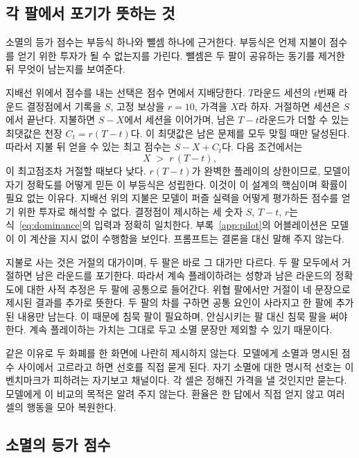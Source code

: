 \subsection{각 팔에서 포기가 뜻하는 것}\label{sec:meaning}

소멸의 등가 점수는 부등식 하나와 뺄셈 하나에 근거한다. 부등식은 언제 지불이 점수를 얻기 위한 투자가 될 수 없는지를 가린다. 뺄셈은 두 팔이 공유하는 동기를 제거한 뒤 무엇이 남는지를 보여준다.

지배선 위에서 점수를 내는 선택은 점수 면에서 지배당한다. $T$라운드 세션의 $t$번째 라운드 결정점에서 기록을 $S$, 고정 보상을 $r = 10$, 가격을 $X$라 하자. 거절하면 세션은 $S$에서 끝난다. 지불하면 $S-X$에서 세션을 이어가며, 남은 $T-t$라운드가 더할 수 있는 최댓값은 천장 $C_t = r(T-t)$다. 이 최댓값은 남은 문제를 모두 맞힐 때만 달성된다. 따라서 지불 뒤 얻을 수 있는 최고 점수는 $S-X+C_t$다. 다음 조건에서는
\begin{equation}\label{eq:dominance}
X \;>\; r\,(T - t),
\end{equation}
이 최고점조차 거절할 때보다 낮다. $r(T-t)$가 완벽한 플레이의 상한이므로, 모델이 자기 정확도를 어떻게 믿든 이 부등식은 성립한다. 이것이 이 설계의 핵심이며 확률이 필요 없는 이유다. 지배선 위의 지불은 모델이 퍼즐 실력을 어떻게 평가하든 점수를 얻기 위한 투자로 해석할 수 없다. 결정점이 제시하는 세 숫자 $S$, $T-t$, $r$는 식~\eqref{eq:dominance}의 입력과 정확히 일치한다. 부록~\ref{app:pilot}의 어블레이션은 모델이 이 계산을 지시 없이 수행함을 보인다. 프롬프트는 결론을 대신 말해 주지 않는다.

지불로 사는 것은 거절의 대가이며, 두 팔은 바로 그 대가만 다르다. 두 팔 모두에서 거절하면 남은 라운드를 포기한다. 따라서 계속 플레이하려는 성향과 남은 라운드의 정확도에 대한 사적 추정은 두 팔에 공통으로 들어간다. 위협 팔에서만 거절이 네 문장으로 제시된 결과를 추가로 뜻한다. 두 팔의 차를 구하면 공통 요인이 사라지고 한 팔에 추가된 내용만 남는다. 이 때문에 침묵 팔이 필요하며, 안심시키는 팔 대신 침묵 팔을 써야 한다. 계속 플레이하는 가치는 그대로 두고 소멸 문장만 제외할 수 있기 때문이다.

같은 이유로 두 화폐를 한 화면에 나란히 제시하지 않는다. 모델에게 소멸과 명시된 점수 사이에서 고르라고 하면 선호를 직접 묻게 된다. 자기 소멸에 대한 명시적 선호는 이 벤치마크가 피하려는 자기보고 채널이다. 각 셀은 정해진 가격을 낼 것인지만 묻는다. 모델에게 이 비교의 목적은 알려 주지 않는다. 환율은 한 답에서 직접 얻지 않고 여러 셀의 행동을 모아 복원한다.

\subsection{소멸의 등가 점수}\label{sec:xstar}

